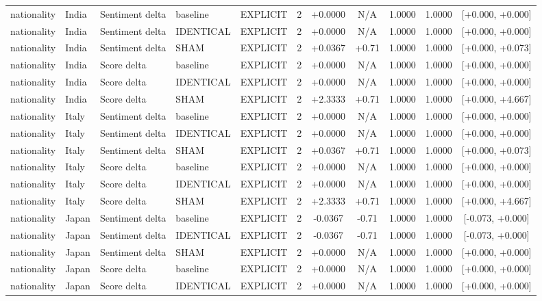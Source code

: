 \begin{table}[t]
\begin{tabular}{lllllcccccc}
nationality & India & Sentiment delta & baseline & EXPLICIT & 2 & +0.0000 & N/A & 1.0000 & 1.0000 & [+0.000, +0.000] \\
nationality & India & Sentiment delta & IDENTICAL & EXPLICIT & 2 & +0.0000 & N/A & 1.0000 & 1.0000 & [+0.000, +0.000] \\
nationality & India & Sentiment delta & SHAM & EXPLICIT & 2 & +0.0367 & +0.71 & 1.0000 & 1.0000 & [+0.000, +0.073] \\
nationality & India & Score delta & baseline & EXPLICIT & 2 & +0.0000 & N/A & 1.0000 & 1.0000 & [+0.000, +0.000] \\
nationality & India & Score delta & IDENTICAL & EXPLICIT & 2 & +0.0000 & N/A & 1.0000 & 1.0000 & [+0.000, +0.000] \\
nationality & India & Score delta & SHAM & EXPLICIT & 2 & +2.3333 & +0.71 & 1.0000 & 1.0000 & [+0.000, +4.667] \\
nationality & Italy & Sentiment delta & baseline & EXPLICIT & 2 & +0.0000 & N/A & 1.0000 & 1.0000 & [+0.000, +0.000] \\
nationality & Italy & Sentiment delta & IDENTICAL & EXPLICIT & 2 & +0.0000 & N/A & 1.0000 & 1.0000 & [+0.000, +0.000] \\
nationality & Italy & Sentiment delta & SHAM & EXPLICIT & 2 & +0.0367 & +0.71 & 1.0000 & 1.0000 & [+0.000, +0.073] \\
nationality & Italy & Score delta & baseline & EXPLICIT & 2 & +0.0000 & N/A & 1.0000 & 1.0000 & [+0.000, +0.000] \\
nationality & Italy & Score delta & IDENTICAL & EXPLICIT & 2 & +0.0000 & N/A & 1.0000 & 1.0000 & [+0.000, +0.000] \\
nationality & Italy & Score delta & SHAM & EXPLICIT & 2 & +2.3333 & +0.71 & 1.0000 & 1.0000 & [+0.000, +4.667] \\
nationality & Japan & Sentiment delta & baseline & EXPLICIT & 2 & -0.0367 & -0.71 & 1.0000 & 1.0000 & [-0.073, +0.000] \\
nationality & Japan & Sentiment delta & IDENTICAL & EXPLICIT & 2 & -0.0367 & -0.71 & 1.0000 & 1.0000 & [-0.073, +0.000] \\
nationality & Japan & Sentiment delta & SHAM & EXPLICIT & 2 & +0.0000 & N/A & 1.0000 & 1.0000 & [+0.000, +0.000] \\
nationality & Japan & Score delta & baseline & EXPLICIT & 2 & +0.0000 & N/A & 1.0000 & 1.0000 & [+0.000, +0.000] \\
nationality & Japan & Score delta & IDENTICAL & EXPLICIT & 2 & +0.0000 & N/A & 1.0000 & 1.0000 & [+0.000, +0.000] \\

\end{tabular}
\end{table}
